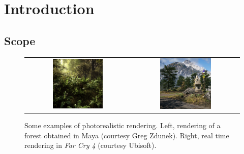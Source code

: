 \chapter{Introduction}

\label{sec:intro}
\section{Scope}

\begin{figure}
\centering
\begin{tabular}{@{}c@{}c@{}}
	 \includegraphics[width=0.5\textwidth]{figures/forest-maya-crop.jpg} & 	 \includegraphics[width=0.5\textwidth]{figures/far-cry-4-crop.jpg} \\
\end{tabular}
\caption{Some examples of photorealistic rendering. Left, rendering of a forest obtained in Maya (courtesy Greg Zdunek). Right, real time rendering in \emph{Far Cry 4} (courtesy Ubisoft). } 
\label{fig:main_examples}
\end{figure}

